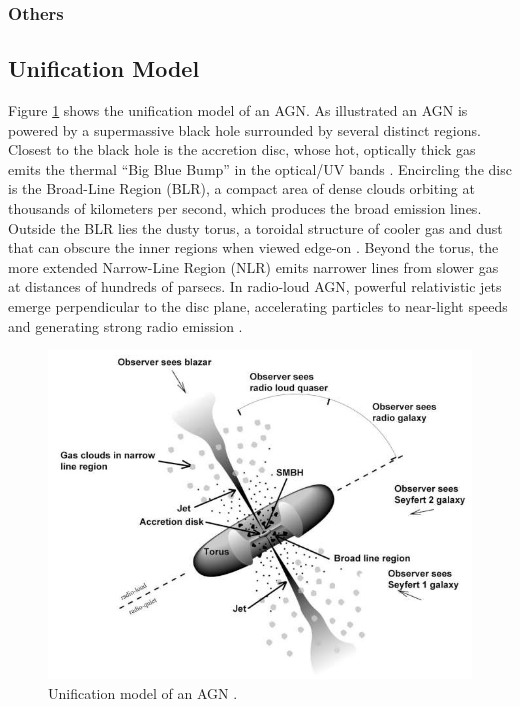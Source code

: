 \subsubsection{Others}



\subsection{Unification Model}
\label{sec:unification_model}
Figure \ref{fig:agn_sed} shows the unification model of an AGN. 
As illustrated an AGN is powered by a supermassive black hole surrounded by several distinct regions. Closest to the black hole is the accretion disc, whose hot, optically thick gas emits the thermal “Big Blue Bump” in the optical/UV bands \parencite{peterson1997introduction}. Encircling the disc is the Broad-Line Region (BLR), a compact area of dense clouds orbiting at thousands of kilometers per second, which produces the broad emission lines. Outside the BLR lies the dusty torus, a toroidal structure of cooler gas and dust that can obscure the inner regions when viewed edge-on \parencite{antonucci1993unified}. Beyond the torus, the more extended Narrow-Line Region (NLR) emits narrower lines from slower gas at distances of hundreds of parsecs. In radio-loud AGN, powerful relativistic jets emerge perpendicular to the disc plane, accelerating particles to near-light speeds and generating strong radio emission \parencite{urry1995unified}.


\begin{figure}[!ht]
	\centering
	\includegraphics[width=\textwidth]{pictures/Chapter2/AGN_unified_model.jpg}
	\caption{Unification model of an AGN \parencite{fermi2025figure1}.}
	\label{fig:agn_sed}
\end{figure}



